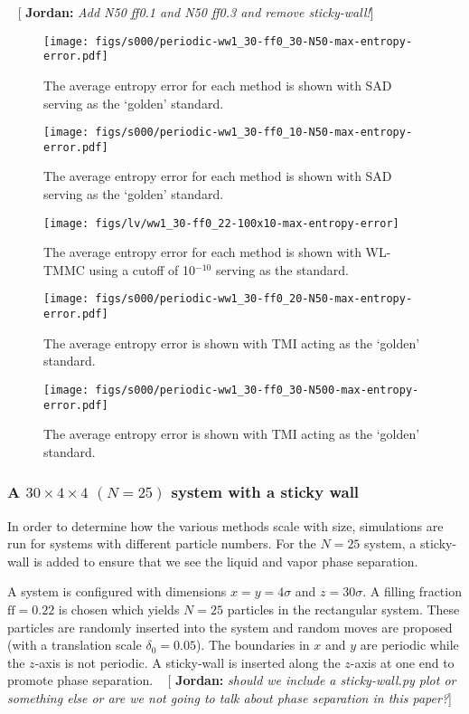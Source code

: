 \documentclass[letterpaper,twocolumn,amsmath,amssymb,pre,aps,10pt]{revtex4-1}
\newcommand{\blue}[1]{{\bf \color{blue} #1}}
\newcommand{\jpsays}[1]{{\color{red} [\blue{Jordan:} \emph{#1}]}}
\begin{document}
~\jpsays{Add N50 ff0.1 and N50 ff0.3 and remove sticky-wall!}
\begin{figure}
  \texttt{[image: figs/s000/periodic-ww1\_30-ff0\_30-N50-max-entropy-error.pdf]}
  \caption{The average entropy error for each method is shown with
  SAD serving as the `golden'
  standard.}\label{fig:avgS-30x4}
\end{figure}
\begin{figure}
  \texttt{[image: figs/s000/periodic-ww1\_30-ff0\_10-N50-max-entropy-error.pdf]}
  \caption{The average entropy error for each method is shown with SAD serving as
  the `golden' standard.}\label{fig:avgS-60x8}
\end{figure}
\begin{figure}
  \texttt{[image: figs/lv/ww1\_30-ff0\_22-100x10-max-entropy-error]}
  \caption{The average entropy error for each method is shown with
    WL-TMMC using a cutoff of 10$^{-10}$ serving as the
    standard.}\label{fig:avgS-100x10}
\end{figure}
\begin{figure}
  \texttt{[image: figs/s000/periodic-ww1\_30-ff0\_20-N50-max-entropy-error.pdf]}
  \caption{The average entropy error is shown with TMI acting as the
  `golden' standard.}\label{fig:N50-mean-error}
\end{figure}
\begin{figure}
\texttt{[image: figs/s000/periodic-ww1\_30-ff0\_30-N500-max-entropy-error.pdf]}
  \caption{The average entropy error is shown with TMI acting as the
  `golden' standard.}
\end{figure}

\subsubsection{A $30\times4\times4$ $(N = 25)$ system with a sticky
wall}
In order to determine how the various methods scale with size,
simulations are run for systems with different particle numbers.  For
the $N = 25$ system, a sticky-wall is added to ensure that we see the
liquid and vapor phase separation.

A system is configured with dimensions $x = y = 4\sigma$ and $z =
30\sigma$.  A filling fraction $\text{ff} = 0.22$ is chosen which
yields $N = 25$ particles in the rectangular system.  These particles
are randomly inserted into the system and random moves are proposed
(with a translation scale $\delta_0 = 0.05$). The boundaries in $x$ and
$y$ are periodic while the $z$-axis is not periodic.  A sticky-wall is
inserted along the $z$-axis at one end to promote phase separation.
~\jpsays{should we include a sticky-wall.py plot or something else or
are we not going to talk about phase separation in this paper?}
\end{document}
